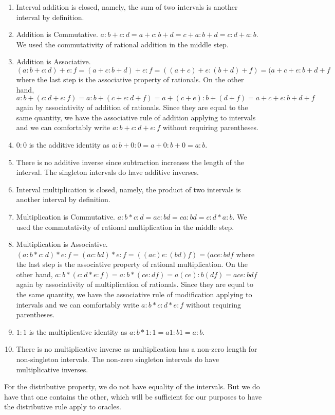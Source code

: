 \documentclass[12pt]{article}
\theoremstyle{remark}
\begin{document}
\begin{enumerate}
    \item Interval addition is closed, namely, the sum of two intervals is another interval by definition. 
    \item Addition is Commutative. $a:b + c:d= a+c : b+d = c+a:b+d = c:d + a:b$. We used the commutativity of rational addition in the middle step. 
    \item Addition is Associative. $(a:b + c:d) + e:f = (a+c:b+d)+e:f = ((a+c)+e:(b+d)+f) = (a+c+e:b+d+f$ where the last step is the associative property of rationals.  On the other hand, $a:b + (c:d+e:f) = a:b + (c+e:d+f) = a+(c+e):b+(d+f) = a+c+e:b+d+f$ again by associativity of addition of rationals. Since they are equal to the same quantity, we have the associative rule of addition applying to intervals and we can comfortably write $a:b + c:d + e:f$ without requiring parentheses. 
    \item $0:0$ is the additive identity as $a:b+0:0 = a+0:b+0 = a:b$. 
    \item There is no additive inverse since subtraction increases the length of the interval. The singleton intervals do have additive inverses. 
    \item Interval multiplication is closed, namely, the product of two intervals is another interval by definition. 
    \item Multiplication is Commutative. $a:b * c:d= ac : bd = ca:bd = c:d * a:b$. We used the commutativity of rational multiplication in the middle step. 
    \item Multiplication is Associative. $(a:b * c:d) * e:f = (ac:bd)*e:f = ((ac)e:(bd)f) = (ace:bdf$ where the last step is the associative property of rational multiplication.  On the other hand, $a:b * (c:d*e:f) = a:b * (ce:df) = a(ce):b(df) = ace:bdf$ again by associativity of multiplication of rationals. Since they are equal to the same quantity, we have the associative rule of modification applying to intervals and we can comfortably write $a:b * c:d * e:f$ without requiring parentheses.     
    \item $1:1$ is the multiplicative identity as $a:b*1:1 = a1:b1 = a:b$. 
    \item There is no multiplicative inverse as multiplication has a non-zero length for non-singleton intervals. The non-zero singleton intervals do have multiplicative inverses. 
\end{enumerate}

For the distributive property, we do not have equality of the intervals. But we do have that one contains the other, which will be sufficient for our purposes to have the distributive rule apply to oracles. 
\end{document}
